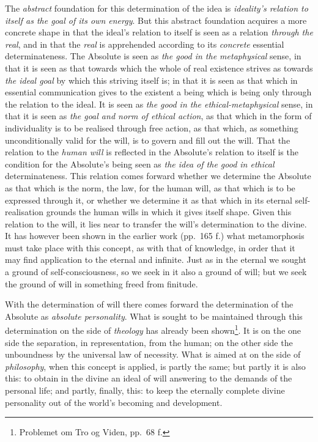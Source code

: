 \documentclass[12pt,a4paper]{book}
\begin{document}
The \emph{abstract} foundation for this determination of the idea is
\emph{ideality's relation to itself as the goal of its own energy}. But this
abstract foundation acquires a more concrete shape in that the ideal's
relation to itself is seen as a relation \emph{through the real}, and in that
the \emph{real} is apprehended according to its \emph{concrete} essential
determinateness. The Absolute is seen as \emph{the good in the metaphysical}
sense, in that it is seen as that towards which the whole of real existence
strives as towards \emph{the ideal goal} by which this striving itself is; in
that it is seen as that which in essential communication gives to the existent
a being which is being only through the relation to the ideal. It is seen as
\emph{the good in the ethical-metaphysical} sense, in that it is seen as
\emph{the goal and norm of ethical action}, as that which in the form of
individuality is to be realised through free action, as that which, as
something unconditionally valid for the will, is to govern and fill out the
will. That the relation to the \emph{human will} is reflected in the
Absolute's relation to itself is the condition for the Absolute's being seen
as \emph{the idea of the good in ethical} determinateness. This relation comes
forward whether we determine the Absolute as that which is the norm, the law,
for the human will, as that which is to be expressed through it, or whether we
determine it as that which in its eternal self-realisation grounds the human
wills in which it gives itself shape. Given this relation to the will, it lies
near to transfer the will's determination to the divine. It has however been
shown in the earlier work (pp.\ 165 f.) what metamorphosis must take place
with this concept, as with that of knowledge, in order that it may find
application to the eternal and infinite. Just as in the eternal we sought a
ground of self-consciousness, so we seek in it also a ground of will; but we
seek the ground of will in something freed from finitude.

With the determination of will there comes forward the determination of the
Absolute as \emph{absolute personality}. What
\setcounter{footnote}{0}%
is sought to be maintained through this determination on the side of
\emph{theology} has already been shown\footnote{Problemet om Tro og Viden,
pp.\ 68 f.}. It is on the one side the separation, in representation, from the
human; on the other side the unboundness by the universal law of necessity.
What is aimed at on the side of \emph{philosophy}, when this concept is
applied, is partly the same; but partly it is also this: to obtain in the
divine an ideal of will answering to the demands of the personal life; and
partly, finally, this: to keep the eternally complete divine personality out
of the world's becoming and development.
\end{document}
